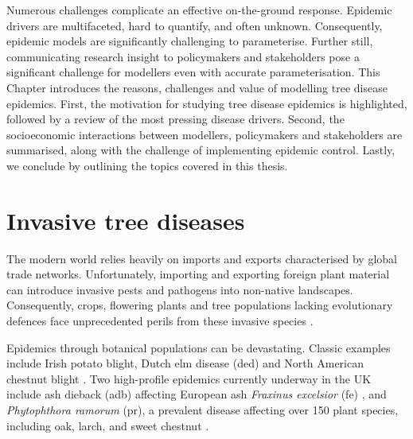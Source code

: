Numerous challenges complicate an effective on-the-ground response. Epidemic drivers are multifaceted, hard to quantify, and often unknown. 
Consequently, epidemic models are significantly challenging to parameterise. 
Further still, communicating research insight to policymakers and stakeholders pose a significant challenge for modellers even with accurate parameterisation.
This Chapter introduces the reasons, challenges and value of modelling tree disease epidemics.
First, the motivation for studying tree disease epidemics is highlighted, followed by a review of the most pressing disease drivers.
Second, the socioeconomic interactions between modellers, policymakers and stakeholders are summarised, along with the challenge of implementing epidemic control.
Lastly, we conclude by outlining the topics covered in this thesis.

\newpage

\section{Invasive tree diseases}

The modern world relies heavily on imports and exports characterised by global trade networks. 
Unfortunately, importing and exporting foreign plant material can introduce invasive pests and pathogens into non-native landscapes. 
Consequently, crops, flowering plants and tree populations lacking evolutionary defences face unprecedented perils from these invasive species \cite{doi:10.1002/9781444329988.ch8}.


Epidemics through botanical populations can be devastating.
Classic examples include Irish potato blight, Dutch elm disease (\acrshort{ded}) \cite{doi:10.1111/j.1365-3059.2010.02391.x} 
and North American chestnut blight \cite{doi:10.1002/9780470535486.ch7}.
Two high-profile epidemics currently underway in the UK include ash dieback (\acrshort{adb}) affecting European ash \textit{Fraxinus excelsior} (\acrshort{fe})
\cite{ash-dieback-costs}, and \textit{Phytophthora ramorum} (\acrshort{pr}), a prevalent disease affecting over 150 plant species, including oak, 
larch, and sweet chestnut \cite{p.ramourum}.

